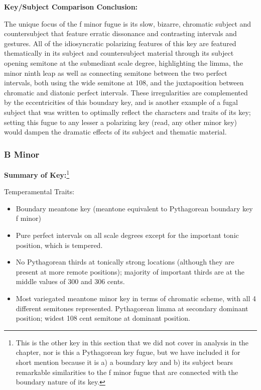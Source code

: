 \textbf{Key/Subject Comparison Conclusion:}

The unique focus of the f minor fugue is its slow, bizarre, chromatic
subject and countersubject that feature erratic dissonance and
contrasting intervals and gestures. All of the idiosyncratic polarizing
features of this key are featured thematically in its subject and
countersubject material through its subject opening semitone at the
submediant scale degree, highlighting the limma, the minor ninth leap as
well as connecting semitone between the two perfect intervals, both
using the wide semitone at 108, and the juxtaposition between chromatic
and diatonic perfect intervals. These irregularities are complemented by
the eccentricities of this boundary key, and is another example of a
fugal subject that was written to optimally reflect the characters and
traits of its key; setting this fugue to any lesser a polarizing key
(read, any other minor key) would dampen the dramatic effects of its
subject and thematic material.

    \subsubsection{B Minor}\label{b-minor}

\textbf{Summary of
Key:}\footnote{This is the other key in this section that we did not cover in analysis in the chapter, nor is this a Pythagorean key fugue, but we have included it for short mention because it is a) a boundary key and b) its subject bears remarkable similarities to the f minor fugue that are connected with the boundary nature of its key.}


    \begin{center}
    \end{center}
    
    Temperamental Traits:

\begin{itemize}
\tightlist
\item
  Boundary meantone key (meantone equivalent to Pythagorean boundary key
  f minor)
\item
  Pure perfect intervals on all scale degrees except for the important
  tonic position, which is tempered.
\item
  No Pythagorean thirds at tonically strong locations (although they are
  present at more remote positions); majority of important thirds are at
  the middle values of 300 and 306 cents.
\item
  Most variegated meantone minor key in terms of chromatic scheme, with
  all 4 different semitones represented. Pythagorean limma at secondary
  dominant position; widest 108 cent semitone at dominant position.
\end{itemize}

